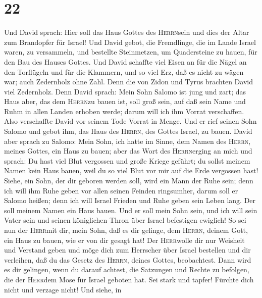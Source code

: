 \hypertarget{section-21}{%
\section{22}\label{section-21}}

 Und David sprach: Hier soll das Haus Gottes des
\textsc{Herrn}sein und dies der Altar zum Brandopfer für Israel!
 Und David gebot, die Fremdlinge, die im Lande Israel
waren, zu versammeln, und bestellte Steinmetzen, um Quadersteine zu
hauen, für den Bau des Hauses Gottes.  Und David schaffte
viel Eisen an für die Nägel an den Torflügeln und für die Klammern, und
so viel Erz, daß es nicht zu wägen war;  auch Zedernholz
ohne Zahl. Denn die von Zidon und Tyrus brachten David viel Zedernholz.
 Denn David sprach: Mein Sohn Salomo ist jung und zart;
das Haus aber, das dem \textsc{Herrn}zu bauen ist, soll groß sein, auf
daß sein Name und Ruhm in allen Landen erhoben werde; darum will ich ihm
Vorrat verschaffen. Also verschaffte David vor seinem Tode Vorrat in
Menge.  Und er rief seinen Sohn Salomo und gebot ihm, das
Haus des \textsc{Herrn}, des Gottes Israel, zu bauen. 
David aber sprach zu Salomo: Mein Sohn, ich hatte im Sinne, dem Namen
des \textsc{Herrn}, meines Gottes, ein Haus zu bauen; 
aber das Wort des \textsc{Herrn}erging an mich und sprach: Du hast viel
Blut vergossen und große Kriege geführt; du sollst meinem Namen kein
Haus bauen, weil du so viel Blut vor mir auf die Erde vergossen hast!
 Siehe, ein Sohn, der dir geboren werden soll, wird ein
Mann der Ruhe sein; denn ich will ihm Ruhe geben vor allen seinen
Feinden ringsumher, darum soll er Salomo heißen; denn ich will Israel
Frieden und Ruhe geben sein Leben lang.  Der soll meinem
Namen ein Haus bauen. Und er soll mein Sohn sein, und ich will sein
Vater sein und seinen königlichen Thron über Israel befestigen ewiglich!
 So sei nun der \textsc{Herr}mit dir, mein Sohn, daß es
dir gelinge, dem \textsc{Herrn}, deinem Gott, ein Haus zu bauen, wie er
von dir gesagt hat!  Der \textsc{Herr}wolle dir nur
Weisheit und Verstand geben und möge dich zum Herrscher über Israel
bestellen und dir verleihen, daß du das Gesetz des \textsc{Herrn},
deines Gottes, beobachtest.  Dann wird es dir gelingen,
wenn du darauf achtest, die Satzungen und Rechte zu befolgen, die der
\textsc{Herr}dem Mose für Israel geboten hat. Sei stark und tapfer!
Fürchte dich nicht und verzage nicht!  Und siehe, in
